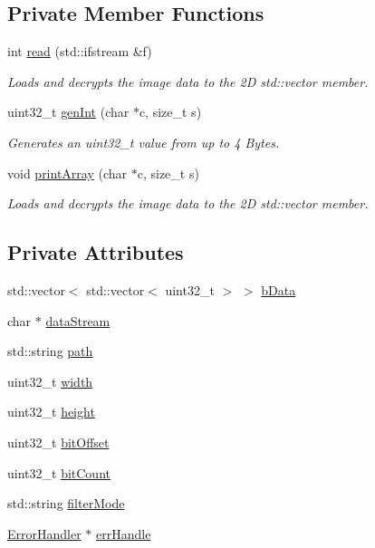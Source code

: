 \subsection*{Private Member Functions}
\begin{DoxyCompactItemize}
\item 
int \mbox{\hyperlink{classBitmapArray_a3a5834d03cd095769b422d4d66b9435f}{read}} (std\+::ifstream \&f)
\begin{DoxyCompactList}\small\item\em Loads and decrypts the image data to the 2D std\+::vector member. \end{DoxyCompactList}\item 
uint32\+\_\+t \mbox{\hyperlink{classBitmapArray_a158fbbaa026332a732f644a8c368a2f0}{gen\+Int}} (char $\ast$c, size\+\_\+t s)
\begin{DoxyCompactList}\small\item\em Generates an uint32\+\_\+t value from up to 4 Bytes. \end{DoxyCompactList}\item 
void \mbox{\hyperlink{classBitmapArray_a99a8a164e51e29407f24dab4752232c1}{print\+Array}} (char $\ast$c, size\+\_\+t s)
\begin{DoxyCompactList}\small\item\em Loads and decrypts the image data to the 2D std\+::vector member. \end{DoxyCompactList}\end{DoxyCompactItemize}
\subsection*{Private Attributes}
\begin{DoxyCompactItemize}
\item 
std\+::vector$<$ std\+::vector$<$ uint32\+\_\+t $>$ $>$ \mbox{\hyperlink{classBitmapArray_a4af158b9be17ce7ebeab8729c2b34ab2}{b\+Data}}
\item 
char $\ast$ \mbox{\hyperlink{classBitmapArray_adce9e9343b6f351ddfaa32c234d18a0a}{data\+Stream}}
\item 
std\+::string \mbox{\hyperlink{classBitmapArray_a3a3e1fbdd198c6731c7f6e20fb492445}{path}}
\item 
uint32\+\_\+t \mbox{\hyperlink{classBitmapArray_a44f51b2c1ecde3f9aa504df25d65b6c9}{width}}
\item 
uint32\+\_\+t \mbox{\hyperlink{classBitmapArray_adb8d1a8fcc55c3884ad3eea71c6042be}{height}}
\item 
uint32\+\_\+t \mbox{\hyperlink{classBitmapArray_abcab200a1eb84331f7c79702e9199694}{bit\+Offset}}
\item 
uint32\+\_\+t \mbox{\hyperlink{classBitmapArray_a18127e27d4b1477fd46ef0c0b3dbc110}{bit\+Count}}
\item 
std\+::string \mbox{\hyperlink{classBitmapArray_adfd3e5a1eed42e37b22a4f2f2560ad67}{filter\+Mode}}
\item 
\mbox{\hyperlink{classErrorHandler}{Error\+Handler}} $\ast$ \mbox{\hyperlink{classBitmapArray_a8d95e8cb2bf8c0f618465a389e8ffe4d}{err\+Handle}}
\end{DoxyCompactItemize}


